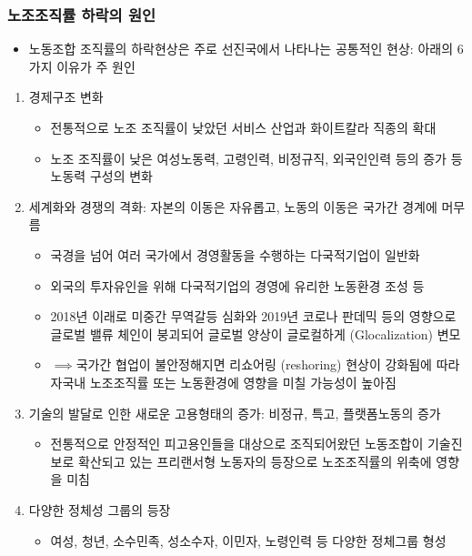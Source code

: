 \documentclass[aspectratio=169,xcolor=dvipsnames,handout]{beamer}
\begin{document}
\begin{frame}[allowframebreaks]
    \frametitle{노조조직률 하락의 원인}
    \begin{itemize}[<+->]
        \item 노동조합 조직률의 하락현상은 주로 선진국에서 나타나는 공통적인 현상: 아래의 6가지 이유가 주 원인
    \end{itemize}
    \begin{enumerate}[<+->]
        \item  경제구조 변화
        \begin{itemize}
                \item 전통적으로 노조 조직률이 낮았던 서비스 산업과 화이트칼라 직종의 확대
                \item 노조 조직률이 낮은 여성노동력, 고령인력, 비정규직, 외국인인력 등의 증가 등 노동력 구성의 변화
        \end{itemize}
        \framebreak%
        \item  세계화와 경쟁의 격화: 자본의 이동은 자유롭고, 노동의 이동은 국가간 경계에 머무름
        \begin{itemize}
                \item 국경을 넘어 여러 국가에서 경영활동을 수행하는 다국적기업이 일반화
                \item 외국의 투자유인을 위해 다국적기업의 경영에 유리한 노동환경 조성 등
                    \item 2018년 이래로 미중간 무역갈등 심화와 2019년 코로나 판데믹 등의 영향으로 글로벌 밸류 체인이 붕괴되어 글로벌 양상이 글로컬하게 (Glocalization) 변모
                        \item $\implies$국가간 협업이 불안정해지면 리쇼어링 (reshoring) 현상이 강화됨에 따라 자국내 노조조직률 또는 노동환경에 영향을 미칠 가능성이 높아짐
        \end{itemize}
        \framebreak%
        \item  기술의 발달로 인한 새로운 고용형태의 증가: 비정규, 특고, 플랫폼노동의 증가
        \begin{itemize}
                \item 전통적으로 안정적인 피고용인들을 대상으로 조직되어왔던 노동조합이 기술진보로 확산되고 있는 프리랜서형 노동자의 등장으로 노조조직률의 위축에 영향을 미침 
        \end{itemize}
        \item  다양한 정체성 그룹의 등장
        \begin{itemize}
                \item 여성, 청년, 소수민족, 성소수자, 이민자, 노령인력 등 다양한 정체그룹 형성

\end{itemize}
\end{enumerate}
\end{frame}
\end{document}
